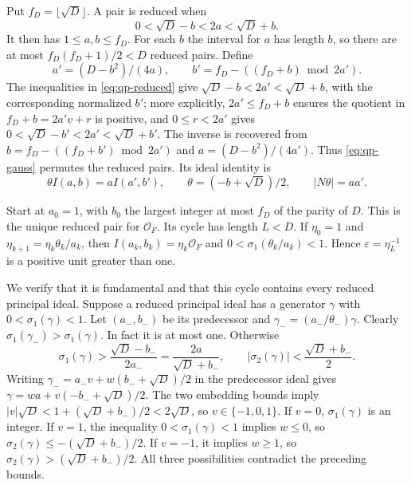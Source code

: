 Put $f_D=\lfloor\sqrt D\rfloor$.  A pair is reduced when
\begin{equation}
 0<\sqrt D-b<2a<\sqrt D+b.
 \label{eq:qp-reduced}
\end{equation}
It then has $1\leq a,b\leq f_D$.  For each $b$ the interval for $a$ has
length $b$, so there are at most $f_D(f_D+1)/2<D$ reduced pairs.  Define
\begin{equation}
 a'=(D-b^2)/(4a),\qquad
 b'=f_D-((f_D+b)\bmod 2a').
 \label{eq:qp-gauss}
\end{equation}
The inequalities in \eqref{eq:qp-reduced} give
$\sqrt D-b<2a'<\sqrt D+b$, with the corresponding normalized $b'$;
more explicitly, $2a'\leq f_D+b$ ensures the quotient in
$f_D+b=2a'v+r$ is positive, and $0\leq r<2a'$ gives
$0<\sqrt D-b'<2a'<\sqrt D+b'$.  The inverse is recovered from
$b=f_D-((f_D+b')\bmod2a')$ and $a=(D-b^2)/(4a')$.
Thus \eqref{eq:qp-gauss} permutes the reduced pairs.  Its ideal identity is
\begin{equation}
 \theta I(a,b)=a I(a',b'),
 \qquad \theta=(-b+\sqrt D)/2,
 \qquad |N\theta|=aa'.
 \label{eq:qp-step-identity}
\end{equation}

Start at $a_0=1$, with $b_0$ the largest integer at most $f_D$ of the
parity of $D$.  This is the unique reduced pair for $\mathcal O_F$.
Its cycle has length $L<D$.  If
$\eta_0=1$ and $\eta_{k+1}=\eta_k\theta_k/a_k$, then
$I(a_k,b_k)=\eta_k\mathcal O_F$ and
$0<\sigma_1(\theta_k/a_k)<1$.  Hence
$\varepsilon=\eta_L^{-1}$ is a positive unit greater than one.

We verify that it is fundamental and that this cycle contains every
reduced principal ideal.  Suppose a reduced principal ideal has a
generator $\gamma$ with $0<\sigma_1(\gamma)<1$.  Let
$(a_-,b_-)$ be its predecessor and
$\gamma_-=(a_-/\theta_-)\gamma$.  Clearly
$\sigma_1(\gamma_-) >\sigma_1(\gamma)$.  In fact it is at most one.
Otherwise
\[
 \sigma_1(\gamma)>
 \frac{\sqrt D-b_-}{2a_-}=
 \frac{2a}{\sqrt D+b_-},
 \qquad
 |\sigma_2(\gamma)|<\frac{\sqrt D+b_-}{2}.
\]
Writing
$\gamma_-=a_-v+w(b_-+\sqrt D)/2$ in the predecessor ideal gives
$\gamma=wa+v(-b_-+\sqrt D)/2$.  The two embedding bounds imply
$|v|\sqrt D<1+(\sqrt D+b_-)/2<2\sqrt D$, so
$v\in\{-1,0,1\}$.  If $v=0$, $\sigma_1(\gamma)$ is an integer.
If $v=1$, the inequality $0<\sigma_1(\gamma)<1$ implies $w\leq0$,
so $\sigma_2(\gamma)\leq-(\sqrt D+b_-)/2$.  If $v=-1$, it implies
$w\geq1$, so $\sigma_2(\gamma)>(\sqrt D+b_-)/2$.  All three
possibilities contradict the preceding bounds.

